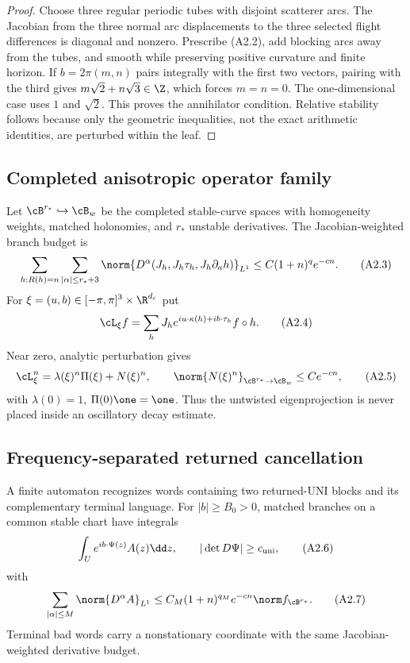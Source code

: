 \begin{proof}
Choose three regular periodic tubes with disjoint scatterer arcs.  The
Jacobian from the three normal arc displacements to the three selected flight
differences is diagonal and nonzero.  Prescribe (A2.2), add blocking arcs away
from the tubes, and smooth while preserving positive curvature and finite
horizon.  If $b=2\pi(m,n)$ pairs integrally with the first two vectors, pairing
with the third gives $m\sqrt2+n\sqrt3\in\Z$, which forces $m=n=0$.
The one-dimensional case uses $1$ and $\sqrt2$.  This proves the annihilator
condition.  Relative stability follows because only the geometric
inequalities, not the exact arithmetic identities, are perturbed within the
leaf.
\end{proof}

\subsection{Completed anisotropic operator family}

Let $\cB^{r_*}\hookrightarrow\cB_w$ be the completed stable-curve spaces with
homogeneity weights, matched holonomies, and $r_*$ unstable derivatives.  The
Jacobian-weighted branch budget is
\[
 \sum_{h:R(h)=n}\sum_{|\alpha|\le r_*+3}
 \norm{D^\alpha(J_h,J_h\tau_h,J_h\partial_a h)}_{L^1}
 \le C(1+n)^qe^{-cn}.                                    \tag{A2.3}
\]
For $\xi=(u,b)\in[-\pi,\pi]^3\times\R^{d_c}$ put
\[
 \cL_\xi f=\sum_hJ_he^{iu\cdot\kappa(h)+ib\cdot\tau_h}f\circ h.       \tag{A2.4}
\]
Near zero, analytic perturbation gives
\[
 \cL_\xi^n=\lambda(\xi)^n\Pi(\xi)+N(\xi)^n,
 \qquad \norm{N(\xi)^n}_{\cB^{r_*}\to\cB_w}\le Ce^{-cn},             \tag{A2.5}
\]
with $\lambda(0)=1$, $\Pi(0)\one=\one$.  Thus the untwisted eigenprojection
is never placed inside an oscillatory decay estimate.

\subsection{Frequency-separated returned cancellation}

A finite automaton recognizes words containing two returned-UNI blocks and
its complementary terminal language.  For $|b|\ge B_0>0$, matched branches on
a common stable chart have integrals
\[
 \int_Ue^{ib\cdot\Psi(z)}A(z)\dd z,\qquad
 |\det D\Psi|\ge c_{\rm uni},                             \tag{A2.6}
\]
with
\[
 \sum_{|\alpha|\le M}\norm{D^\alpha A}_{L^1}
 \le C_M(1+n)^{q_M}e^{-cn}\norm f_{\cB^{r_*}}.            \tag{A2.7}
\]
Terminal bad words carry a nonstationary coordinate with the same
Jacobian-weighted derivative budget.

